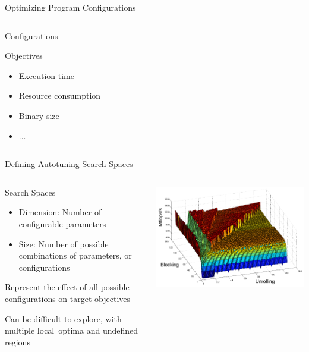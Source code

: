 \documentclass[10pt, compress, aspectratio=169, xcolor={table,usenames,dvipsnames}]{beamer}
\begin{document}
\begin{frame}[label={sec:org458b662}]{Optimizing Program Configurations}
\begin{columns}
\begin{column}{0.5\columnwidth}
\begin{block}{Configurations}
\begin{block}{Objectives}
\begin{itemize}
\item Execution time
\item Resource consumption
\item Binary size
\item \(\dots\)
\end{itemize}
\end{block}
\end{block}
\end{column}
\end{columns}
\end{frame}

\begin{frame}[label={sec:org0a1038d}]{Defining Autotuning Search Spaces}
\begin{columns}
\begin{column}{0.4\columnwidth}
\begin{block}{Search Spaces}
\begin{itemize}
\item \alert{Dimension}: Number of configurable parameters
\item \alert{Size}: Number of possible combinations of parameters, or configurations
\end{itemize}

Represent the \alert{effect} of all possible
configurations on target objectives

Can be difficult to explore, with multiple \mbox{\alert{local optima}}
and \mbox{\alert{undefined}} \mbox{\alert{regions}}
\end{block}
\end{column}

\begin{column}{0.6\columnwidth}
\begin{center}
\includegraphics[width=\columnwidth]{../../../img/seymour2008comparison.pdf}
\end{center}


\end{column}
\end{columns}
\end{frame}
\end{document}
